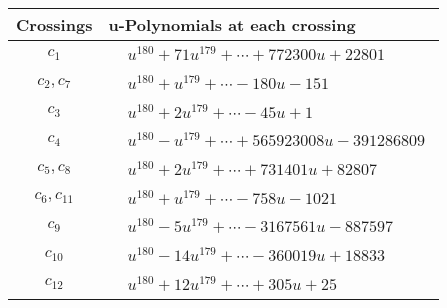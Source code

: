 \documentclass[1p]{elsarticle_modified}
\theoremstyle{definition}
\begin{document}
\begin{tabular}{m{50pt}|m{274pt}}
Crossings & \hspace{64pt}u-Polynomials at each crossing \\
\hline $$\begin{aligned}c_{1}\end{aligned}$$&$\begin{aligned}
&u^{180}+71 u^{179}+\cdots+772300 u+22801
\end{aligned}$\\
\hline $$\begin{aligned}c_{2},c_{7}\end{aligned}$$&$\begin{aligned}
&u^{180}+u^{179}+\cdots-180 u-151
\end{aligned}$\\
\hline $$\begin{aligned}c_{3}\end{aligned}$$&$\begin{aligned}
&u^{180}+2 u^{179}+\cdots-45 u+1
\end{aligned}$\\
\hline $$\begin{aligned}c_{4}\end{aligned}$$&$\begin{aligned}
&u^{180}- u^{179}+\cdots+565923008 u-391286809
\end{aligned}$\\
\hline $$\begin{aligned}c_{5},c_{8}\end{aligned}$$&$\begin{aligned}
&u^{180}+2 u^{179}+\cdots+731401 u+82807
\end{aligned}$\\
\hline $$\begin{aligned}c_{6},c_{11}\end{aligned}$$&$\begin{aligned}
&u^{180}+u^{179}+\cdots-758 u-1021
\end{aligned}$\\
\hline $$\begin{aligned}c_{9}\end{aligned}$$&$\begin{aligned}
&u^{180}-5 u^{179}+\cdots-3167561 u-887597
\end{aligned}$\\
\hline $$\begin{aligned}c_{10}\end{aligned}$$&$\begin{aligned}
&u^{180}-14 u^{179}+\cdots-360019 u+18833
\end{aligned}$\\
\hline $$\begin{aligned}c_{12}\end{aligned}$$&$\begin{aligned}
&u^{180}+12 u^{179}+\cdots+305 u+25
\end{aligned}$\\
\hline
\end{tabular}\\~\\
\end{document}
